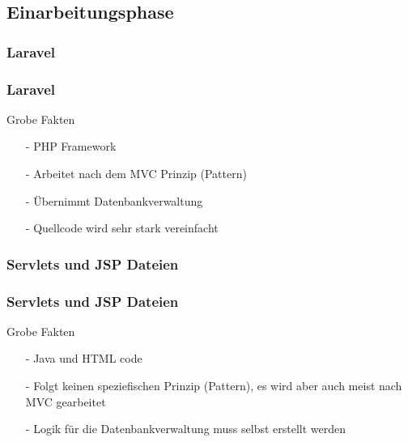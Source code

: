\documentclass[12pt]{beamer}
\begin{document}
\subsection{Einarbeitungsphase}

\subsubsection{Laravel}

\begin{frame}
\frametitle{Laravel}

\begin{Large}
Grobe Fakten \vspace{0.2 cm}
\end{Large} 

\begin{itemize}
	\item[-] PHP Framework
	\item[-] Arbeitet nach dem MVC Prinzip (Pattern)
	\item[-] Übernimmt Datenbankverwaltung  
	\item[-] Quellcode wird sehr stark vereinfacht
\end{itemize}
	
\end{frame}


\subsubsection{Servlets und JSP Dateien}

\begin{frame}
	\frametitle{Servlets und JSP Dateien}
	
	\begin{Large}
		Grobe Fakten \vspace{0.2 cm}
	\end{Large}		
	\begin{itemize}
		\item[-] Java und HTML code
		\item[-] Folgt keinen speziefischen Prinzip (Pattern), es wird aber auch meist nach MVC gearbeitet
		\item[-] Logik für die Datenbankverwaltung muss selbst erstellt werden
		
	\end{itemize}
	
\end{frame}
\end{document}
